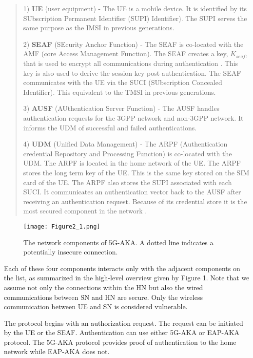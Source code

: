 \documentclass[10pt, pdftex]{article}
\begin{document}
\begin{quote}
1) \textbf{UE} (user equipment) - The UE is a mobile device. It is identified by its SUbscription Permanent Identifier (SUPI)
Identifier). The SUPI serves the same purpose as the IMSI in previous generations.

2) \textbf{SEAF} (SEcurity Anchor Function) - The SEAF is co-located with the AMF (core Access Management Function). The SEAF creates a key, $K_{seaf}$, that is used to encrypt all communications during authentication \cite{zhang2017overview}. This key is also used to derive the session key post authentication. The SEAF communicates with the UE via the SUCI (SUbscription Concealed Identifier). This equivalent to the TMSI in previous generations. 

3) \textbf{AUSF} (AUthentication Server Function) - The AUSF handles authentication requests for the 3GPP network and non-3GPP network. It informs the UDM of successful and failed authentications. 

4) \textbf{UDM} (Unified Data Management) - The ARPF (Authentication credential Repository and Processing Function) is co-located with the UDM. The ARPF is located in the home network of the UE. The ARPF stores the long term key of the UE. This is the same key stored on the SIM card of the UE. The ARPF also stores the SUPI associated with each SUCI. It communicates an authentication vector back to the AUSF after receiving an authentication request. Because of its credential store it is the most secured component in the network \cite{cremers2017comprehensive}.

\end{quote}

\graphicspath{ {./images/} }
\begin{figure}[h]
	\begin{center}
		\texttt{[image: Figure2\_1.png]}
	\end{center}
	\caption{The network components of 5G-AKA. A dotted line indicates a potentially insecure connection.}
\end{figure}

Each of these four components interacts only with the adjacent components on the list, as summarized in the high-level overview given by Figure 1. Note that we assume not only the connections within the HN but also the wired communications between SN and HN are secure. Only the wireless communication between UE and SN is considered vulnerable.

The protocol begins with an authorization request. The request can be initiated by the UE or the SEAF. Authentication can use either 5G-AKA or EAP-AKA protocol. The 5G-AKA protocol provides proof of authentication to the home network while EAP-AKA does not. 
\end{document}
